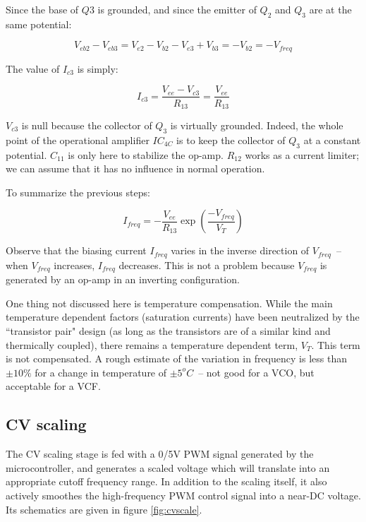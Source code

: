 \documentclass[a4paper,11pt]{article}
\begin{document}
Since the base of $Q3$ is grounded, and since the emitter of $Q_2$ and $Q_3$ are at the same potential:

\begin{equation}
V_{eb2} - V_{eb3} = V_{e2} - V_{b2} - V_{e3} + V_{b3} = -V_{b2} = -V_{freq}
\end{equation}

The value of $I_{c3}$ is simply:

\begin{equation}
I_{c3} = \frac{V_{ee} - V_{c3}}{R_{13}} = \frac{V_{ee}}{R_{13}}
\end{equation}

$V_{c3}$ is null because the collector of $Q_3$ is virtually grounded. Indeed, the whole point of the operational amplifier $IC_{4C}$ is to keep the collector of $Q_3$ at a constant potential. $C_{11}$ is only here to stabilize the op-amp. $R_{12}$ works as a current limiter; we can assume that it has no influence in normal operation.

To summarize the previous steps:

\begin{equation}
I_{freq} = -\frac{V_{ee}}{R_{13}} \exp \left(\frac{-V_{freq}}{V_T} \right)
\end{equation}

Observe that the biasing current $I_{freq}$ varies in the inverse direction of $V_{freq}$~-- when $V_{freq}$ increases, $I_{freq}$ decreases. This is not a problem because $V_{freq}$ is generated by an op-amp in an inverting configuration.

One thing not discussed here is temperature compensation. While the main temperature dependent factors (saturation currents) have been neutralized by the ``transistor pair" design (as long as the transistors are of a similar kind and thermically coupled), there remains a temperature dependent term, $V_T$. This term is not compensated. A rough estimate of the variation in frequency is less than $\pm 10\%$ for a change in temperature of $\pm 5^oC$~-- not good for a VCO, but acceptable for a VCF.

\subsection{CV scaling}

The CV scaling stage is fed with a 0/5V PWM signal generated by the microcontroller, and generates a scaled voltage which will translate into an appropriate cutoff frequency range. In addition to the scaling itself, it also actively smoothes the high-frequency PWM control signal into a near-DC voltage. Its schematics are given in figure \ref{fig:cvscale}.
\end{document}
